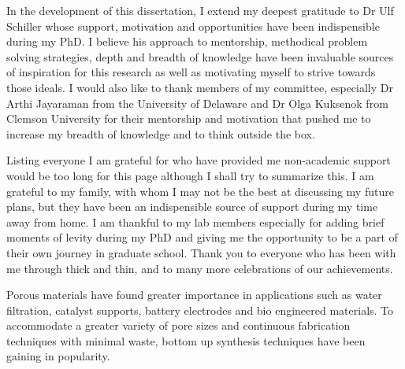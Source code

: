 \begin{front} %


In the development of this dissertation, I extend my deepest gratitude to Dr Ulf Schiller whose support, motivation and 
opportunities have been indispensible during my PhD. I believe his approach to mentorship, methodical problem solving 
strategies, depth and breadth of knowledge have been invaluable sources of inspiration for this research as well as 
motivating myself to strive towards those ideals. I would also like to thank members of my committee, especially 
Dr Arthi Jayaraman from the University of Delaware and Dr Olga Kuksenok from Clemson University for their mentorship 
and motivation that pushed me to increase my breadth of knowledge and to think outside the box.

Listing everyone I am grateful for who have provided me non-academic support would be too long for this page 
although I shall try to summarize this. I am grateful to my family, with whom I may not be the best at 
discussing my future plans, but they have been an indispensible source of support during my time away from home. 
I am thankful to my lab members especially for adding brief moments of levity during my PhD and giving me the 
opportunity to be a part of their own journey in graduate school. Thank you to everyone who has been with me 
through thick and thin, and to many more celebrations of our achievements. 




\maketocloflot


Porous materials have found greater importance in applications such as water filtration, catalyst supports, battery 
electrodes and bio engineered materials. To accommodate a greater variety of pore sizes and continuous fabrication 
techniques with minimal waste, bottom up synthesis techniques have been gaining in popularity. 


\end{front}
